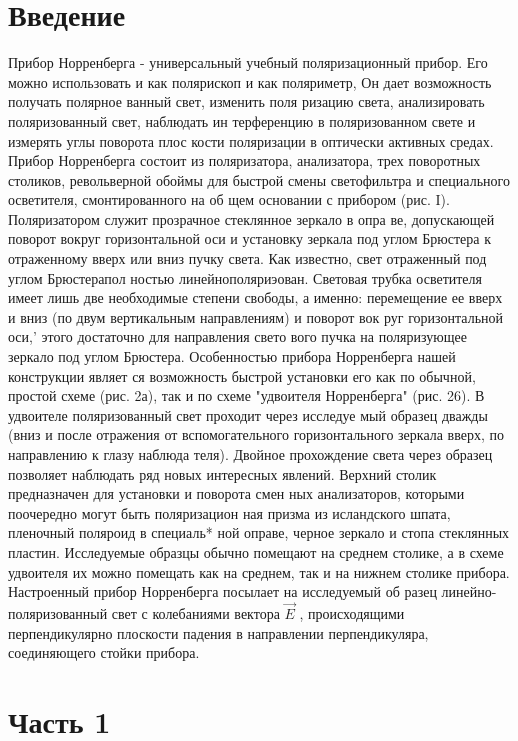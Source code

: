 \section{Введение}
Прибор Норренберга - универсальный учебный поляризационный
прибор. Его можно использовать и как полярископ и как поляриметр,
Он дает возможность получать полярное ванный свет, изменить поля­
ризацию света, анализировать поляризованный свет, наблюдать ин­
терференцию в поляризованном свете и измерять углы поворота плос­
кости поляризации в оптически активных средах.
Прибор Норренберга состоит из поляризатора, анализатора,
трех поворотных столиков, револьверной обоймы для быстрой смены
светофильтра и специального осветителя, смонтированного на об­
щем основании с прибором (рис. I).
Поляризатором служит прозрачное стеклянное зеркало в опра­
ве, допускающей поворот вокруг горизонтальной оси и установку
зеркала под углом Брюстера к отраженному вверх или вниз пучку
света. Как известно, свет отраженный под углом Брюстерапол­
ностью линейнополяриэован. Световая трубка осветителя имеет
лишь две необходимые степени свободы, а именно: перемещение ее
вверх и вниз (по двум вертикальным направлениям) и поворот вок­
руг горизонтальной оси,' этого достаточно для направления свето­
вого пучка на поляризующее зеркало под углом Брюстера.
Особенностью прибора Норренберга нашей конструкции являет­
ся возможность быстрой установки его как по обычной, простой
схеме (рис. 2а), так и по схеме "удвоителя Норренберга" (рис.
26). В удвоителе поляризованный свет проходит через исследуе­
мый образец дважды (вниз и после отражения от вспомогательного
горизонтального зеркала вверх, по направлению к глазу наблюда­
теля). Двойное прохождение света через образец позволяет наблюдать
ряд новых интересных явлений.
Верхний столик предназначен для установки и поворота смен­
ных анализаторов, которыми поочередно могут быть поляризацион­
ная призма из исландского шпата, пленочный поляроид в специаль*
ной оправе, черное зеркало и стопа стеклянных пластин.
Исследуемые образцы обычно помещают на среднем столике, а
в схеме удвоителя их можно помещать как на среднем, так и на
нижнем столике прибора.
Настроенный прибор Норренберга посылает на исследуемый об­
разец линейно-поляризованный свет с колебаниями вектора $\vec{E}$ ,
происходящими перпендикулярно плоскости падения в направлении
перпендикуляра, соединяющего стойки прибора.
\section{Часть 1}

